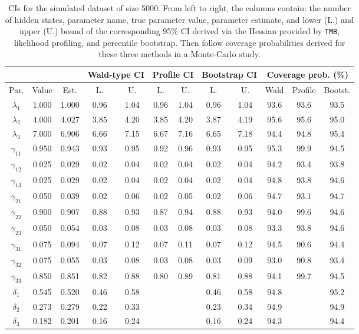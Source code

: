 \documentclass[bimj,fleqn]{w-art}\usepackage[]{graphicx}\usepackage[]{color}
\theoremstyle{plain}
\theoremstyle{definition}
\begin{document}
\begin{table}[ht]
\centering
\begin{tabular}{cccccccccccc}
  &&& \multicolumn{2}{c}{Wald-type CI}& \multicolumn{2}{c}{Profile CI}& \multicolumn{2}{c}{Bootstrap CI}& \multicolumn{3}{c}{Coverage prob. (\%)}\\ \hline
Par. & Value & Est. & L. & U. & L. & U. & L. & U. & {Wald} & Profile & Bootst. \\ 
  \hline
$\lambda_{1}$ & 1.000 & 1.000 & 0.96 & 1.04 & 0.96 & 1.04 & 0.96 & 1.04 & 93.6 & 93.6 & 93.5 \\ 
  $\lambda_{2}$ & 4.000 & 4.027 & 3.85 & 4.20 & 3.85 & 4.20 & 3.87 & 4.19 & 95.6 & 95.6 & 95.0 \\ 
  $\lambda_{3}$ & 7.000 & 6.906 & 6.66 & 7.15 & 6.67 & 7.16 & 6.65 & 7.18 & 94.4 & 94.8 & 95.4 \\ 
  $\gamma_{11}$ & 0.950 & 0.943 & 0.93 & 0.95 & 0.92 & 0.96 & 0.93 & 0.95 & 95.3 & 99.9 & 94.5 \\ 
  $\gamma_{12}$ & 0.025 & 0.029 & 0.02 & 0.04 & 0.02 & 0.04 & 0.02 & 0.04 & 94.2 & 93.4 & 93.8 \\ 
  $\gamma_{13}$ & 0.025 & 0.029 & 0.02 & 0.04 & 0.02 & 0.04 & 0.02 & 0.04 & 94.8 & 93.8 & 94.6 \\ 
  $\gamma_{21}$ & 0.050 & 0.039 & 0.02 & 0.06 & 0.02 & 0.05 & 0.02 & 0.06 & 94.7 & 93.1 & 94.7 \\ 
  $\gamma_{22}$ & 0.900 & 0.907 & 0.88 & 0.93 & 0.87 & 0.94 & 0.88 & 0.93 & 94.0 & 99.6 & 94.6 \\ 
  $\gamma_{23}$ & 0.050 & 0.054 & 0.03 & 0.08 & 0.03 & 0.08 & 0.03 & 0.08 & 93.3 & 93.8 & 94.6 \\ 
  $\gamma_{31}$ & 0.075 & 0.094 & 0.07 & 0.12 & 0.07 & 0.11 & 0.07 & 0.12 & 94.5 & 90.6 & 94.4 \\ 
  $\gamma_{32}$ & 0.075 & 0.055 & 0.03 & 0.08 & 0.03 & 0.08 & 0.03 & 0.09 & 93.0 & 90.8 & 93.4 \\ 
  $\gamma_{33}$ & 0.850 & 0.851 & 0.82 & 0.88 & 0.80 & 0.89 & 0.81 & 0.88 & 94.1 & 99.7 & 94.5 \\ 
  $\delta_{1}$ & 0.545 & 0.520 & 0.46 & 0.58 &  &  & 0.46 & 0.58 & 94.8 &  & 95.2 \\ 
  $\delta_{2}$ & 0.273 & 0.279 & 0.22 & 0.33 &  &  & 0.23 & 0.34 & 94.9 &  & 94.9 \\ 
  $\delta_{3}$ & 0.182 & 0.201 & 0.16 & 0.24 &  &  & 0.16 & 0.24 & 94.3 &  & 94.4 \\ 
   \hline
\end{tabular}
\caption{CIs for the simulated dataset of size 5000. From left to right, the columns contain: the number of hidden states, parameter name, true parameter value, parameter estimate, and lower (L.) and upper (U.) bound of the corresponding 95\% CI derived via the Hessian provided by {\tt TMB}, likelihood profiling, and percentile bootstrap. Then follow coverage probabilities derived for these three methods in a Monte-Carlo study.} 
\label{table:simu2_cis}
\end{table}
\end{document}
